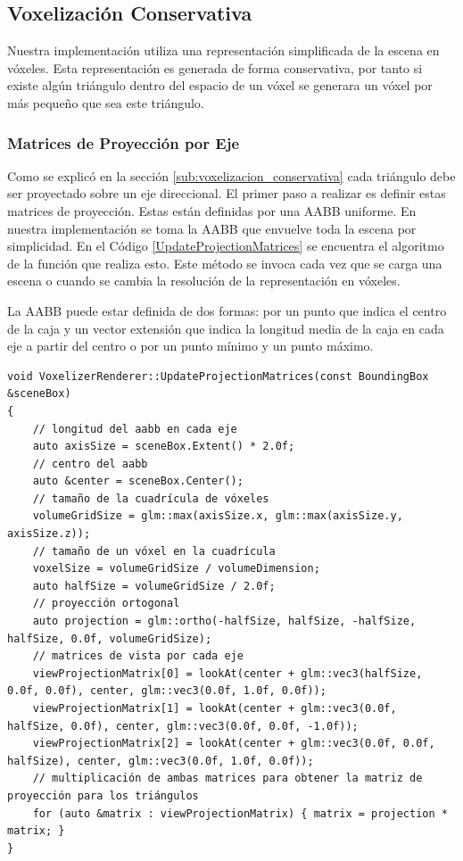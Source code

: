 \subsection{Voxelización Conservativa} %
\label{sub:voxelization_impl}
Nuestra implementación utiliza una representación simplificada de la escena en vóxeles. Esta representación es generada de forma conservativa, por tanto si existe algún triángulo dentro del espacio de un vóxel se generara un vóxel por más pequeño que sea este triángulo.
 
\subsubsection{Matrices de Proyección por Eje}

Como se explicó en la sección \ref{sub:voxelizacion_conservativa} cada triángulo debe ser proyectado sobre un eje direccional. El primer paso a realizar es definir estas matrices de proyección. Estas están definidas por una \ac{AABB} uniforme. En nuestra implementación se toma la \ac{AABB} que envuelve toda la escena por simplicidad. En el Código \ref{UpdateProjectionMatrices} se encuentra el algoritmo de la función que realiza esto. Este método se invoca cada vez que se carga una escena o cuando se cambia la resolución de la representación en vóxeles.

La \ac{AABB} puede estar definida de dos formas: por un punto que indica el centro de la caja y un vector extensión que indica la longitud media de la caja en cada eje a partir del centro o por un punto mínimo y un punto máximo. 
\\
\begin{lstlisting}[caption={Creación de matrices de proyección ortogonal por cada eje direccional}, label=UpdateProjectionMatrices]
void VoxelizerRenderer::UpdateProjectionMatrices(const BoundingBox &sceneBox)
{
    // longitud del aabb en cada eje
    auto axisSize = sceneBox.Extent() * 2.0f;
    // centro del aabb
    auto &center = sceneBox.Center();
    // tamaño de la cuadrícula de vóxeles
    volumeGridSize = glm::max(axisSize.x, glm::max(axisSize.y, axisSize.z));
    // tamaño de un vóxel en la cuadrícula
    voxelSize = volumeGridSize / volumeDimension;
    auto halfSize = volumeGridSize / 2.0f;
    // proyección ortogonal
    auto projection = glm::ortho(-halfSize, halfSize, -halfSize, halfSize, 0.0f, volumeGridSize);
    // matrices de vista por cada eje
    viewProjectionMatrix[0] = lookAt(center + glm::vec3(halfSize, 0.0f, 0.0f), center, glm::vec3(0.0f, 1.0f, 0.0f));
    viewProjectionMatrix[1] = lookAt(center + glm::vec3(0.0f, halfSize, 0.0f), center, glm::vec3(0.0f, 0.0f, -1.0f));
    viewProjectionMatrix[2] = lookAt(center + glm::vec3(0.0f, 0.0f, halfSize), center, glm::vec3(0.0f, 1.0f, 0.0f));
    // multiplicación de ambas matrices para obtener la matriz de proyección para los triángulos
    for (auto &matrix : viewProjectionMatrix) { matrix = projection * matrix; }
}
\end{lstlisting}

